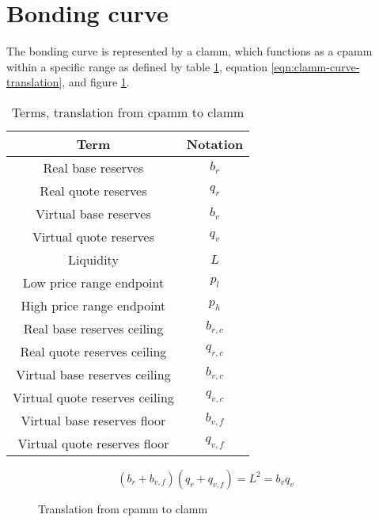 \documentclass[table, twocolumn]{article}
\begin{document}
\section{Bonding curve}

The bonding curve is represented by a \gls*{clamm}, which functions as a \gls*{cpamm}
within a specific range as defined by table \ref{tab:clamm-curve-translation}, equation
\ref{eqn:clamm-curve-translation}, and figure \ref{fig:clamm-curve-translation}.

\begin{table}[!htb]
  \centering
  \begin{tabular}{|c|c|}
    \hline \rowcolor{blue}
    Term                           & Notation  \\ \hline
    Real base reserves             & $b_r$     \\ \hline
    Real quote reserves            & $q_r$     \\ \hline
    Virtual base reserves          & $b_v$     \\ \hline
    Virtual quote reserves         & $q_v$     \\ \hline
    Liquidity                      & $L$       \\ \hline
    Low price range endpoint       & $p_l$     \\ \hline
    High price range endpoint      & $p_h$     \\ \hline
    Real base reserves ceiling     & $b_{r,c}$ \\ \hline
    Real quote reserves ceiling    & $q_{r,c}$ \\ \hline
    Virtual base reserves ceiling  & $b_{v,c}$ \\ \hline
    Virtual quote reserves ceiling & $q_{v,c}$ \\ \hline
    Virtual base reserves floor    & $b_{v,f}$ \\ \hline
    Virtual quote reserves floor   & $q_{v,f}$ \\ \hline
  \end{tabular}
  \caption{Terms, translation from \gls*{cpamm} to \gls*{clamm}}
  \label{tab:clamm-curve-translation}
\end{table}

\begin{equation} \label{eqn:clamm-curve-translation}
  (b_r + b_{v, f})(q_r + q_{v, f}) = L^2 = b_v q_v
\end{equation}

\begin{figure}[!htb]
  \centering
  
  \caption{Translation from \gls*{cpamm} to \gls*{clamm}}
  \label{fig:clamm-curve-translation}
\end{figure}
\end{document}
